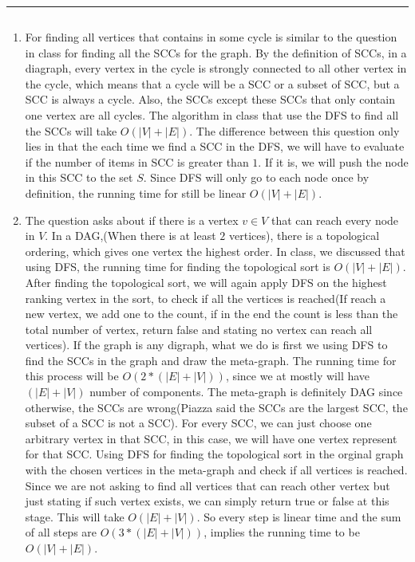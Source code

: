 \documentclass[11pt]{article}
\begin{document}
 $$ $$
\hrule
\begin{solution}
$$ $$
\begin{enumerate}
    \item For finding all vertices that contains in some cycle is similar to the question in class for finding all the SCCs for the graph. By the definition of SCCs, in a diagraph, every vertex in the cycle is strongly connected to all other vertex in the cycle, which means that a cycle will be a SCC or a subset of SCC, but a SCC is always a cycle. Also, the SCCs except these SCCs that only contain one vertex are all cycles. The algorithm in class that use the DFS to find all the SCCs will take $O(|V| + |E|)$. The difference between this question only lies in that the each time we find a SCC in the DFS, we will have to evaluate if the number of items in SCC is greater than $1$. If it is, we will push the node in this SCC to the set $S$. Since DFS will only go to each node once by definition, the running time for still be linear $O(|V| + |E|)$.
    \item The question asks about if there is a vertex $v \in V$ that can reach every node in $V$. In a DAG,(When there is at least $2$ vertices), there is a topological ordering, which gives one vertex the highest order. In class, we discussed that using DFS, the running time for finding the topological sort is $O(|V|+|E|)$. After finding the topological sort, we will again apply DFS on the highest ranking vertex in the sort, to check if all the vertices is reached(If reach a new vertex, we add one to the count, if in the end the count is less than the total number of vertex, return false and stating no vertex can reach all vertices). 
    \newline
    If the graph is any digraph, what we do is first we using DFS to find the SCCs in the graph and draw the meta-graph. The running time for this process will be $O(2*(|E| + |V|))$, since we at mostly will have $(|E|+|V|)$ number of components. The meta-graph is definitely DAG since otherwise, the SCCs are wrong(Piazza said the SCCs are the largest SCC, the subset of a SCC is not a SCC). For every SCC, we can just choose one arbitrary vertex in that SCC, in this case, we will have one vertex represent for that SCC. Using DFS for finding the topological sort in the orginal graph with the chosen vertices in the meta-graph and check if all vertices is reached. Since we are not asking to find all vertices that can reach other vertex but just stating if such vertex exists, we can simply return true or false at this stage. This will take $O(|E|+|V|)$. So every step is linear time and the sum of all steps are $O(3*(|E| + |V|))$, implies the running time to be $O(|V| + |E|)$.
\end{enumerate}
\end{solution}
\end{document}
